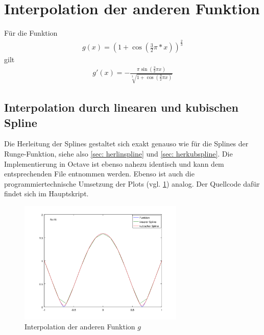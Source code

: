 \documentclass[a4paper, 11pt, ngerman]{scrartcl}
\begin{document}
\section{Interpolation der  anderen Funktion}

Für die Funktion
\begin{align*}
g(x) = \left(1+\cos\left( \frac{3}{2}\pi*x\right)\right)^{\frac{2}{3}}
\end{align*}
gilt
\begin{align*}
g'(x) =-\frac{\pi\sin\left(\frac{3}{2}\pi x\right)}{\sqrt[3]{1+\cos\left(\frac{3}{2}\pi x \right)}}
\end{align*}

\subsection{Interpolation durch linearen und kubischen Spline}
Die Herleitung der Splines gestaltet sich exakt genauso wie für die Splines der Runge-Funktion, siehe also \cref{sec: herlinspline} und \cref{sec: herkubspline}. Die Implementierung in Octave ist ebenso nahezu identisch und kann dem entsprechenden File entnommen werden.
%
%
Ebenso ist auch die programmiertechnische Umsetzung der Plots (vgl. \cref{fig: gplot}) analog. Der Quellcode dafür findet sich im Hauptskript.

\begin{figure}[htbp] 
	\centering
	\includegraphics[width=0.7\textwidth]{../gplot.png}
	\caption{Interpolation der anderen Funktion $g$}
	\label{fig: gplot}
\end{figure}
\end{document}
